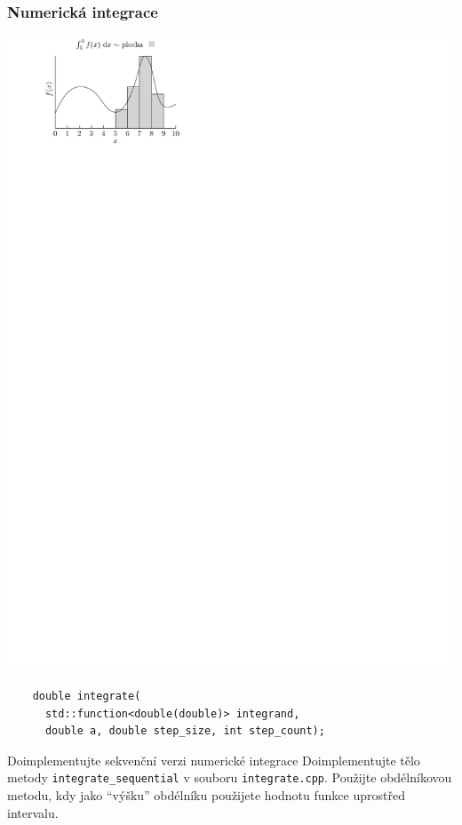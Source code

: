 \documentclass[usenames,dvipsnames,9pt]{beamer}
\begin{document}
{
\begin{frame}[fragile]
  \frametitle{Numerická integrace}
  
  \begin{03/figure}
    \centering\includegraphics{03/figs/integral.pdf}
  \end{03/figure}

  \begin{verbatim}
    double integrate(
      std::function<double(double)> integrand,
      double a, double step_size, int step_count);
  \end{verbatim}
\end{frame}

\begin{frame}[fragile]
  \begin{block}{Doimplementujte sekvenční verzi numerické integrace}
    Doimplementujte tělo metody \texttt{integrate\_sequential} v souboru \texttt{integrate.cpp}.
    Použijte obdélníkovou metodu, kdy jako ``výšku'' obdélníku použijete hodnotu funkce uprostřed intervalu.


\end{block}
\end{frame}}
\end{document}
